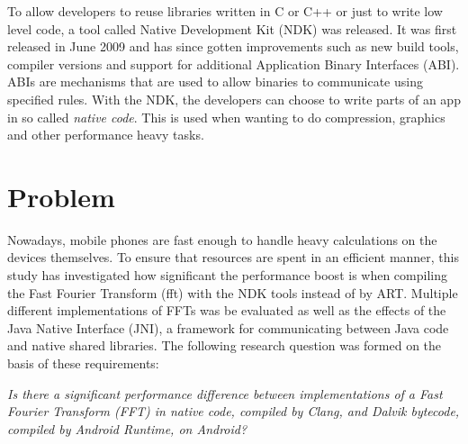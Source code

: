 To allow developers to reuse libraries written in C or C++ or just to write low level code, a tool called Native Development Kit (NDK) was released. It was first released in June 2009 \cite{Lin2011} and has since gotten improvements such as new build tools, compiler versions and support for additional Application Binary Interfaces (ABI). ABIs are mechanisms that are used to allow binaries to communicate using specified rules. With the NDK, the developers can choose to write parts of an app in so called \emph{native code}. This is used when wanting to do compression, graphics and other performance heavy tasks.


\section{Problem}
Nowadays, mobile phones are fast enough to handle heavy calculations on the devices themselves. To ensure that resources are spent in an efficient manner, this study has investigated how significant the performance boost is when compiling the Fast Fourier Transform (\gls{fft}) with the NDK tools instead of by ART. Multiple different implementations of FFTs was be evaluated as well as the effects of the Java Native Interface (JNI), a framework for communicating between Java code and native shared libraries. The following research question was formed on the basis of these requirements:



\begin{center}
    \textit{Is there a significant performance difference between implementations of a Fast Fourier Transform (FFT) in native code, compiled by Clang, and Dalvik bytecode, compiled by Android Runtime, on Android?}
\end{center}


